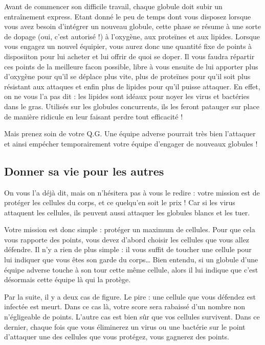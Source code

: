 \documentclass[a4paper,twoside,12pt]{article}
\begin{document}
Avant de commencer son difficile travail, chaque globule doit subir un
entra\^inement  express.  Etant  donn\'e  le peu  de  temps dont  vous
disposez  lorsque vous  avez besoin  d'int\'egrer un  nouveau globule,
cette phase se r\'esume \`a une sorte de dopage (oui, c'est autoris\'e
!)   \`a l'oxyg\`ene,  aux prote\"ines  et aux  lipides.  Lorsque vous
engagez un nouvel  \'equipier, vous aurez donc une  quantit\'e fixe de
points  \`a disposiiton  pour lui  acheter et  lui offrir  de  quoi se
doper.  Il vous  faudra r\'epartir  ces points  de la  meilleure facon
possible, libre \`a vous ensuite de lui apporter plus d'oxyg\`ene pour
qu'il se d\'eplace plus vite, plus de prote\"ines pour qu'il soit plus
r\'esistant aux  attaques et enfin  plus de lipides pour  qu'il puisse
attaquer. En effet, on ne vous l'a pas dit : les lipides sont id\'eaux
pour noyer les  virus et bact\'eries dans le  gras. Utilis\'es sur les
globules concurrents,  ils les feront patauger sur  place de mani\`ere
ridicule en leur faisant perdre tout efficacit\'e !

Mais prenez  soin de votre  Q.G. Une \'equipe adverse  pourrait tr\`es
bien  l'attaquer  et ainsi  emp\'echer  temporairement votre  \'equipe
d'engager de nouveaux globules !

\subsection{Donner sa vie pour les autres}

On vous l'a d\'ej\`a dit, mais  on n'h\'esitera pas \`a vous le redire
:  votre  mission est  de  prot\'eger les  cellules  du  corps, et  ce
quelqu'en soit le prix ! Car  si les virus attaquent les cellules, ils
peuvent aussi attaquer les globules blancs et les tuer.


Votre   mission  est   donc  simple   :  prot\'eger   un   maximum  de
cellules. Pour que  cela vous rapporte des points,  vous devez d'abord
choisir les cellules que vous allez  d\'efendre. Il n'y a rien de plus
simple : il  vous suffit de toucher une cellule  pour lui indiquer que
vous \^etes  son garde  du corps\ldots{} Bien  entendu, si  un globule
d'une \'equipe adverse touche \`a son tour cette m\^eme cellule, alors
il  lui indique  que  c'est  d\'esormais cette  \'equipe  l\`a qui  la
prot\`ege.

Par la  suite, il y a  deux cas de figure.  Le pire :  une cellule que
vous  d\'efendez est  infect\'ee est  meurt. Dans  ce cas  l\`a, votre
score   sera   rabaiss\'e    d'un   nombre   non   n'\'egligeable   de
points. L'autre cas est bien s\^ur que vos cellules survivent. Dans ce
dernier, chaque fois que vous  \'eliminerez un virus ou une bact\'erie
sur le  point d'attaquer  une des cellules  que vous  prot\'egez, vous
gagnerez des points.
\end{document}
